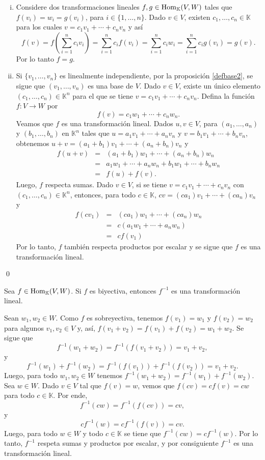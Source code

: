 \dem
\begin{enumerate}[(i)]
\item Considere dos transformaciones lineales $f,g\in\operatorname{Hom}_{\mathbb{K}}(V,W)$ tales que $f(v_i)=w_i=g(v_i)$, para $i\in\{1,\ldots,n\}$. Dado $v\in V$, existen $c_1,\ldots,c_n\in \mathbb{K}$ para los cuales $v=c_1v_1+\cdots+c_nv_n$ y así 
\[
f(v)=f\left(\sum_{i=1}^nc_iv_i\right)=\sum_{i=1}^nc_if(v_i)=\sum_{i=1}^nc_iw_i=\sum_{i=1}^nc_ig(v_i)=g(v).
\]
Por lo tanto $f=g$.
\item Si $\{v_1,\ldots,v_n\}$ es linealmente independiente, por la proposici\'on \ref{defbase2}, se sigue que $(v_1,\ldots,v_n)$ es una base de $V$. Dado $v\in V$, existe un \'unico elemento $(c_1,\ldots, c_n)\in \mathbb{K}^n$ para el que se tiene $v=c_1v_1+\cdots+c_nv_n$. Defina la funci\'on $f:V\rightarrow W$ por
\[
f(v)=c_1w_1+\cdots+c_nw_n.
\]
Veamos que $f$ es una transformaci\'on lineal. Dados $u,v\in V$, para $(a_1,\ldots, a_n)$ y $(b_1,\ldots, b_n)$ en $\mathbb{K}^n$ tales que $u=a_1v_1+\cdots+a_nv_n$ y $v=b_1v_1+\cdots+b_nv_n$, obtenemos $u+v =  (a_1+b_1)v_1+\cdots+(a_n+b_n)v_n$ y
\begin{eqnarray*}
f(u+v) & = & (a_1+b_1)w_1+\cdots+(a_n+b_n)w_n\\
     & = & a_1w_1+\cdots+a_nw_n+ b_1w_1+\cdots+b_nw_n\\
     & = & f(u)+f(v).
\end{eqnarray*} 
Luego, $f$ respecta sumas.
Dado $v\in V$, si se tiene $v=c_1v_1+\cdots+c_nv_n$ con $(c_1,\ldots, c_n)\in \mathbb{K}^n$, entonces, para todo $c\in \mathbb{K}$, $cv = (ca_1)v_1+\cdots+(ca_n)v_n$ y
\begin{eqnarray*}
f(cv_1) & = & (ca_1)w_1+\cdots+(ca_n)w_n\\
     & = & c(a_1w_1+\cdots+a_nw_n)\\
     & = & cf(v_1)
\end{eqnarray*}
Por lo tanto, $f$ tambi\'en respecta productos por escalar y se sigue que $f$ es una transformaci\'on lineal.
\end{enumerate}\qed

\begin{prop}
Sea $f\in\operatorname{Hom}_{\mathbb{K}}(V,W)$. Si $f$ es biyectiva, entonces $f^{-1}$ es una transformaci\'on lineal. 
\end{prop}

\dem Sean $w_1,w_2\in W$. Como $f$ es sobreyectiva, tenemos $f(v_1)=w_1$ y $f(v_2)=w_2$ para algunos $v_1,v_2\in V$ y, as\'i, $f(v_1+v_2)=f(v_1)+f(v_2)=w_1+w_2$. Se sigue que
\[
f^{-1}(w_1+w_2)=f^{-1}\left(f(v_1+v_2)\right)=v_1+v_2,
\] 
y
\[
f^{-1}(w_1)+f^{-1}(w_2)=f^{-1}\left(f(v_1)\right)+f^{-1}\left(f(v_2)\right)=v_1+v_2.
\]
Luego, para todo $w_1,w_2\in W$ tenemos $f^{-1}(w_1+w_2)=f^{-1}(w_1)+f^{-1}(w_2)$.\\
Sea $w\in W$. Dado $v\in V$ tal que $f(v)=w$, vemos que $f(cv)=cf(v)=cw$ para todo $c\in \mathbb{K}$. Por ende,
\[
f^{-1}(cw)=f^{-1}\left(f(cv)\right)=cv,
\]
y
\[
cf^{-1}(w)=cf^{-1}\left(f(v)\right)=cv.
\]
Luego, para todo $w\in W$ y todo $c\in \mathbb{K}$ se tiene que $f^{-1}(cw)=cf^{-1}(w)$. Por lo tanto, $f^{-1}$ respeta sumas y productos por escalar, y por consiguiente $f^{-1}$ es una transformaci\'on lineal.


